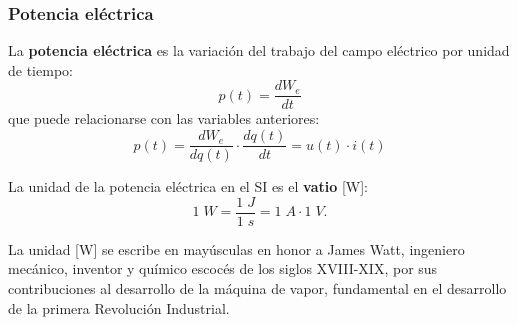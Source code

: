 	\subsubsection{Potencia eléctrica}
	La \textbf{potencia eléctrica} es la variación del trabajo del
        campo eléctrico por unidad de tiempo:
	\begin{equation*}
          p(t)=\frac{dW_{e}}{dt} 
	\end{equation*}
	que puede relacionarse con las variables anteriores:
	\begin{equation*}\label{eq:pvi}
          p(t) = \frac{dW_e}{dq(t)} \cdot \frac{dq(t)}{dt}= u(t)\cdot i(t)
	\end{equation*}
	
	La {unidad} de la potencia eléctrica en el SI es el
        \textbf{vatio} [W]:
	\begin{equation*}
          1\;W = \dfrac{1\;J}{1\;s}= 1\;A\cdot 1\;V.
	\end{equation*}
	\begin{remark}
          La unidad [W] se escribe en mayúsculas en honor a James
          Watt, ingeniero mecánico, inventor y químico escocés de los
          siglos XVIII-XIX, por sus contribuciones al desarrollo de la
          máquina de vapor, fundamental en el desarrollo de la primera
          Revolución Industrial.
	\end{remark}
	
